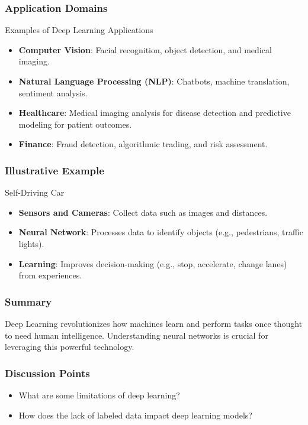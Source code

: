 \documentclass[aspectratio=169]{beamer}
\begin{document}
\begin{frame}[fragile]
    \frametitle{Application Domains}
    \begin{block}{Examples of Deep Learning Applications}
        \begin{itemize}
            \item \textbf{Computer Vision}: Facial recognition, object detection, and medical imaging.
            \item \textbf{Natural Language Processing (NLP)}: Chatbots, machine translation, sentiment analysis.
            \item \textbf{Healthcare}: Medical imaging analysis for disease detection and predictive modeling for patient outcomes.
            \item \textbf{Finance}: Fraud detection, algorithmic trading, and risk assessment.
        \end{itemize}
    \end{block}
\end{frame}

\begin{frame}[fragile]
    \frametitle{Illustrative Example}
    \begin{block}{Self-Driving Car}
        \begin{itemize}
            \item \textbf{Sensors and Cameras}: Collect data such as images and distances.
            \item \textbf{Neural Network}: Processes data to identify objects (e.g., pedestrians, traffic lights).
            \item \textbf{Learning}: Improves decision-making (e.g., stop, accelerate, change lanes) from experiences.
        \end{itemize}
    \end{block}
\end{frame}

\begin{frame}[fragile]
    \frametitle{Summary}
    Deep Learning revolutionizes how machines learn and perform tasks once thought to need human intelligence. Understanding neural networks is crucial for leveraging this powerful technology.
\end{frame}

\begin{frame}[fragile]
    \frametitle{Discussion Points}
    \begin{itemize}
        \item What are some limitations of deep learning?
        \item How does the lack of labeled data impact deep learning models?
    \end{itemize}
\end{frame}
\end{document}

